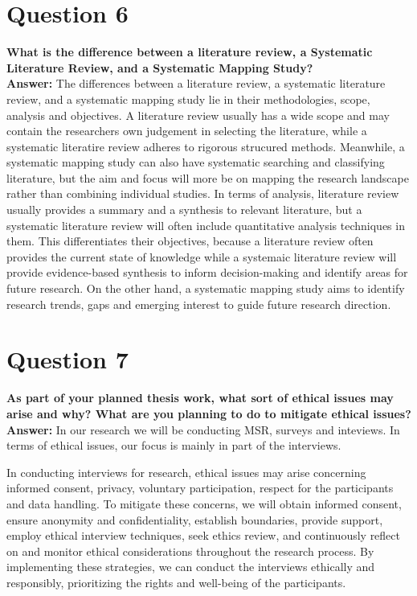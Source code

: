 \documentclass[conference]{IEEEtran}
\begin{document}
\section{Question 6}

\textbf{What is the difference between a literature review, a Systematic Literature Review, and a Systematic Mapping Study?}\\

\textbf{Answer:}
The differences between a literature review, a systematic literature review, and a systematic mapping study lie in their methodologies, scope, analysis and objectives. A literature review usually has a wide scope and may contain the researchers own judgement in selecting the literature, while a systematic literatire review adheres to rigorous strucured methods. Meanwhile, a systematic mapping study can also have systematic searching and classifying literature, but the aim and focus will more be on mapping the research landscape rather than combining individual studies.
In terms of analysis, literature review usually provides a summary and a synthesis to relevant literature, but a systematic literature review will often include quantitative analysis techniques in them. This differentiates their objectives, because a literature review often provides the current state of knowledge while a systemaic literature review will provide evidence-based synthesis to inform decision-making and identify areas for future research. On the other hand, a systematic mapping study aims to identify research trends, gaps and emerging interest to guide future research direction. 



\section{Question 7}

\textbf{As part of your planned thesis work, what sort of ethical issues may arise and why? What are you planning to do to mitigate ethical issues?}\\

\textbf{Answer:} 
In our research we will be conducting MSR, surveys and inteviews. In terms of ethical issues, our focus is mainly in part of the interviews.

In conducting interviews for research, ethical issues may arise concerning informed consent, privacy, voluntary participation, respect for the participants and data handling. To mitigate these concerns, we will obtain informed consent, ensure anonymity and confidentiality, establish boundaries, provide support, employ ethical interview techniques, seek ethics review, and continuously reflect on and monitor ethical considerations throughout the research process. By implementing these strategies, we can conduct the interviews ethically and responsibly, prioritizing the rights and well-being of the participants.
\end{document}
